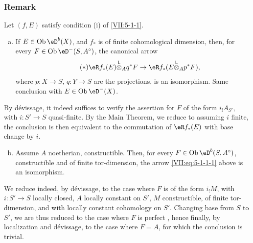 \subsubsection{Remark}\label{VII:5-1-2}

Let $(f,E)$ satisfy condition (i) of \ref{VII:5-1-1}.
\begin{enumerate}[a)]
  \item If $E\in \ob \eD^b(X)$, and $f_\ast$ is of finite cohomological
    dimension, then, for every $F\in \ob\eD^-(S,A^\circ)$, the canonical arrow
    \begin{equation*}\tag{$*$}\label{VII:eq:5-1-1-1}
      \eR f_\ast(E)\lotimes_A q^\ast F \to \eR f_\ast(E\lotimes_A p^\ast F) \text{,}
    \end{equation*}
    where $p:X\to S$, $q:Y\to S$ are the projections, is an isomorphism.
    Same conclusion with $E\in\ob\eD^-(X)$.
\end{enumerate}

By d\'evissage, it indeed suffices to verify the assertion for $F$ of the
form $i_! A_{S'}$, with $i:S'\to S$ quasi-finite. By the Main Theorem, we reduce
to assuming $i$ finite, the conclusion is then equivalent to the
commutation of $\eR f_\ast(E)$ with base change by $i$.
\begin{enumerate}[a)]
\setcounter{enumi}{1}
  \item Assume $A$ noetherian, constructible. Then, for every
    $F\in\ob\eD^b(S,A^\circ)$, constructible and of finite tor-dimension, the
    arrow \eqref{VII:eq:5-1-1-1} above is an isomorphism.
\end{enumerate}

We reduce indeed, by d\'evissage, to the case where $F$ is of the form
$i_! M$, with $i:S'\to S$ locally closed, $A$ locally constant on $S'$,
$M$ constructible, of finite tor-dimension, and with locally constant
cohomology on $S'$. Changing base from $S$ to $S'$, we are thus reduced to the
case where $F$ is perfect \cite[I]{sga6}, hence finally, by localization and
d\'evissage, to the case where $F=A$, for which the conclusion is trivial.




\subsubsection{}\label{VII:5-1-3}

